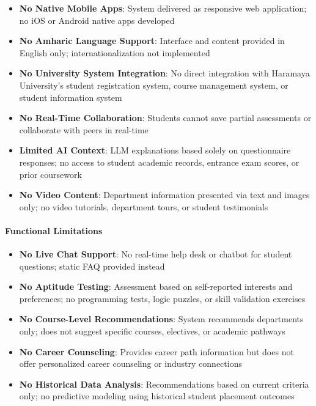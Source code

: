 \documentclass[12pt, a4paper]{article}
\begin{document}
\begin{itemize}[leftmargin=1.5em, itemsep=3pt]
    \item \textbf{No Native Mobile Apps}: System delivered as responsive web application; no iOS or Android native apps developed
    
    \item \textbf{No Amharic Language Support}: Interface and content provided in English only; internationalization not implemented
    
    \item \textbf{No University System Integration}: No direct integration with Haramaya University's student registration system, course management system, or student information system
    
    \item \textbf{No Real-Time Collaboration}: Students cannot save partial assessments or collaborate with peers in real-time
    
    \item \textbf{Limited AI Context}: LLM explanations based solely on questionnaire responses; no access to student academic records, entrance exam scores, or prior coursework
    
    \item \textbf{No Video Content}: Department information presented via text and images only; no video tutorials, department tours, or student testimonials
\end{itemize}

\paragraph{Functional Limitations}

\begin{itemize}[leftmargin=1.5em, itemsep=3pt]
    \item \textbf{No Live Chat Support}: No real-time help desk or chatbot for student questions; static FAQ provided instead
    
    \item \textbf{No Aptitude Testing}: Assessment based on self-reported interests and preferences; no programming tests, logic puzzles, or skill validation exercises
    
    \item \textbf{No Course-Level Recommendations}: System recommends departments only; does not suggest specific courses, electives, or academic pathways
    
    \item \textbf{No Career Counseling}: Provides career path information but does not offer personalized career counseling or industry connections
    
    \item \textbf{No Historical Data Analysis}: Recommendations based on current criteria only; no predictive modeling using historical student placement outcomes
\end{itemize}
\end{document}
